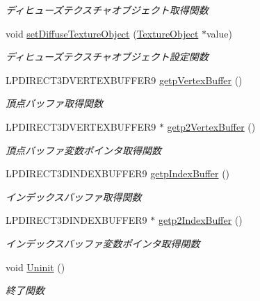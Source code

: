 \begin{DoxyCompactItemize}
\begin{DoxyCompactList}\small\item\em ディヒューズテクスチャオブジェクト取得関数 \end{DoxyCompactList}\item 
void \mbox{\hyperlink{class_md_bin_object_1_1_mesh_a8f050909bab779ea4f8ac96dbe7e47b4}{set\+Diffuse\+Texture\+Object}} (\mbox{\hyperlink{class_texture_object}{Texture\+Object}} $\ast$value)
\begin{DoxyCompactList}\small\item\em ディヒューズテクスチャオブジェクト設定関数 \end{DoxyCompactList}\item 
L\+P\+D\+I\+R\+E\+C\+T3\+D\+V\+E\+R\+T\+E\+X\+B\+U\+F\+F\+E\+R9 \mbox{\hyperlink{class_md_bin_object_1_1_mesh_a62ca792b3cbc96fa052555dfca83eb3d}{getp\+Vertex\+Buffer}} ()
\begin{DoxyCompactList}\small\item\em 頂点バッファ取得関数 \end{DoxyCompactList}\item 
L\+P\+D\+I\+R\+E\+C\+T3\+D\+V\+E\+R\+T\+E\+X\+B\+U\+F\+F\+E\+R9 $\ast$ \mbox{\hyperlink{class_md_bin_object_1_1_mesh_a0b0cc5058ce31c35d38a42c099615746}{getp2\+Vertex\+Buffer}} ()
\begin{DoxyCompactList}\small\item\em 頂点バッファ変数ポインタ取得関数 \end{DoxyCompactList}\item 
L\+P\+D\+I\+R\+E\+C\+T3\+D\+I\+N\+D\+E\+X\+B\+U\+F\+F\+E\+R9 \mbox{\hyperlink{class_md_bin_object_1_1_mesh_a5a8c1392a554808067e27163c942cf02}{getp\+Index\+Buffer}} ()
\begin{DoxyCompactList}\small\item\em インデックスバッファ取得関数 \end{DoxyCompactList}\item 
L\+P\+D\+I\+R\+E\+C\+T3\+D\+I\+N\+D\+E\+X\+B\+U\+F\+F\+E\+R9 $\ast$ \mbox{\hyperlink{class_md_bin_object_1_1_mesh_a0028dae2742769687d2cc6c5a7f3518e}{getp2\+Index\+Buffer}} ()
\begin{DoxyCompactList}\small\item\em インデックスバッファ変数ポインタ取得関数 \end{DoxyCompactList}\item 
void \mbox{\hyperlink{class_md_bin_object_1_1_mesh_a05413005511d6715ce8ea9142b257e7a}{Uninit}} ()
\begin{DoxyCompactList}\small\item\em 終了関数 \end{DoxyCompactList}\end{DoxyCompactItemize}
